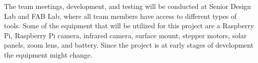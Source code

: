 The team meetings, development, and testing will be conducted at Senior Design Lab and FAB Lab, where all team members have access to different types of tools. Some of the equipment that will be utilized for this project are a Raspberry Pi, Raspberry Pi camera, infrared camera, surface mount, stepper motors, solar panels, zoom lens, and battery. Since the project is at early stages of development the equipment might change.
